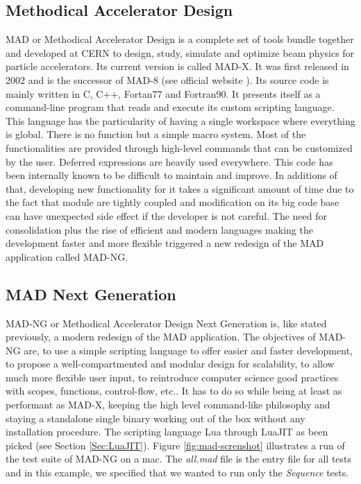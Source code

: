 

\subsection{Methodical Accelerator Design}
\label{Subsec:mad-orig}

MAD or Methodical Accelerator Design is a complete set of tools bundle together
and developed at CERN to design, study, simulate and optimize beam physics for
particle accelerators. Its current version is called MAD-X. It was first released
in 2002 and is the successor of  MAD-8 (see official website \cite{madx}).
Its source code is mainly written in C, C++, Fortan77 and Fortran90.
It presents itself as a command-line program that reads and execute its custom
scripting language. This language has the particularity of having a single
workspace where everything is global. There is no function but a simple macro
system. Most of the functionalities are provided through high-level commands that
can be customized by the user. Deferred expressions are heavily used everywhere.
This code has been internally known to
be difficult to maintain and improve. In additions of that, developing new
functionality for it takes a significant amount of time due to the fact that
module are tightly coupled and modification on its big code base can have
unexpected side effect if the developer is not careful. The need for
consolidation plus the rise of efficient and modern languages making the
development faster and more flexible triggered a new redesign of the MAD
application called MAD-NG.



\subsection{MAD Next Generation}
\label{Subsec:mad-ng}

MAD-NG or Methodical Accelerator Design Next Generation is, like stated previously,
a modern redesign of the MAD application. The objectives of MAD-NG are, to use
a simple scripting language to offer easier and faster development, to propose
a well-compartmented and modular design for scalability, to allow much more
flexible user input, to reintroduce computer science good practices with scopes,
functions, control-flow, etc.. It has to do so while being at least as performant
as MAD-X, keeping the high level command-like philosophy and staying a standalone
single binary working out of the box without any installation procedure.
The scripting language Lua through LuaJIT as been picked (see Section \ref{Sec:LuaJIT}).
Figure \ref{fig:mad-screnshot} illustrates a run of the test suite of MAD-NG on
a mac. The \emph{all.mad} file is the entry file for all tests and in this example,
we specified that we wanted to run only the \emph{Sequence} tests.

